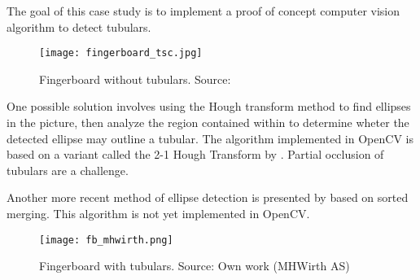 The goal of this case study is to implement a proof of concept computer vision algorithm to detect tubulars.

\begin{figure}[ht]
    \centering
    \texttt{[image: fingerboard\_tsc.jpg]}
    \caption{Fingerboard without tubulars. Source:\cite{fig_fb_tsc15}}
    \label{fig:fb_tsc15}
\end{figure}
\FloatBarrier

One possible solution involves using the Hough transform method to find ellipses in the picture, then analyze the region contained within to determine wheter the detected ellipse may outline a tubular. The algorithm implemented in OpenCV is based on a variant called the 2-1 Hough Transform by \citet{yuen90}. Partial occlusion of tubulars are a challenge.

Another more recent method of ellipse detection is presented by \citet{wang14} based on sorted merging. This algorithm is not yet implemented in OpenCV.

\begin{figure}[ht]
    \centering
    \texttt{[image: fb\_mhwirth.png]}
    \caption{Fingerboard with tubulars. Source: Own work (MHWirth AS)}
    \label{fig:fb_mhwirth}
\end{figure}
\FloatBarrier


